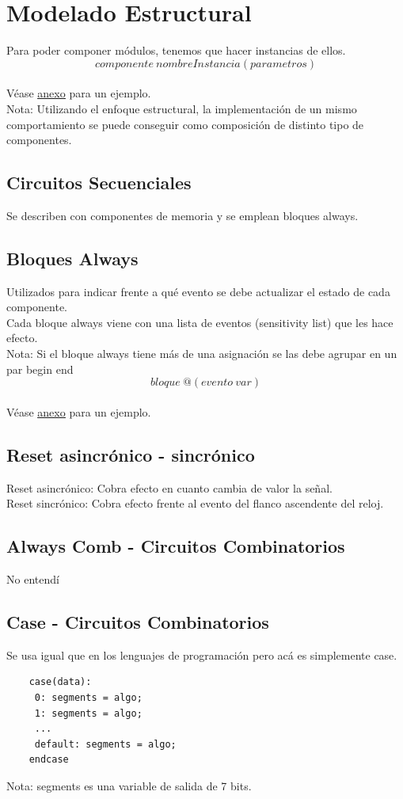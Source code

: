 \documentclass[10pt,a4paper]{article}
\begin{document}
\section*{Modelado Estructural}
Para poder componer módulos, tenemos que hacer instancias de ellos. 
\[componente \ nombreInstancia(parametros)\] \\ 
Véase \hyperref[subsec:SVL_comp]{\underline{anexo}} para un ejemplo. \\
Nota: Utilizando el enfoque estructural, la implementación de un mismo comportamiento se puede conseguir como composición de distinto tipo de componentes. 
\subsection*{Circuitos Secuenciales}
Se describen con componentes de memoria y se emplean bloques always.
\subsection*{Bloques Always}
\label{subsec:bloques_always}
Utilizados para indicar frente a qué evento se debe actualizar el estado de cada componente. \\ 
Cada bloque always viene con una lista de eventos (sensitivity list) que les hace efecto.  \\
Nota: Si el bloque always tiene más de una asignación se las debe agrupar en un par begin end \\
\[bloque \ @(evento \ var)\] \\ 
Véase \hyperref[subsec:SVL_bloques_clk]{\underline{anexo}} para un ejemplo. 
\subsection*{Reset asincrónico - sincrónico}
Reset asincrónico: Cobra efecto en cuanto cambia de valor la señal. \\ 
Reset sincrónico: Cobra efecto frente al evento del flanco ascendente del reloj.
\subsection*{Always Comb - Circuitos Combinatorios}
No entendí
\subsection*{Case - Circuitos Combinatorios}
Se usa igual que en los lenguajes de programación pero acá es simplemente case.
\begin{lstlisting}
    case(data):
     0: segments = algo;
     1: segments = algo; 
     ...
     default: segments = algo; 
    endcase
\end{lstlisting}
Nota: segments es una variable de salida de 7 bits.
\end{document}
